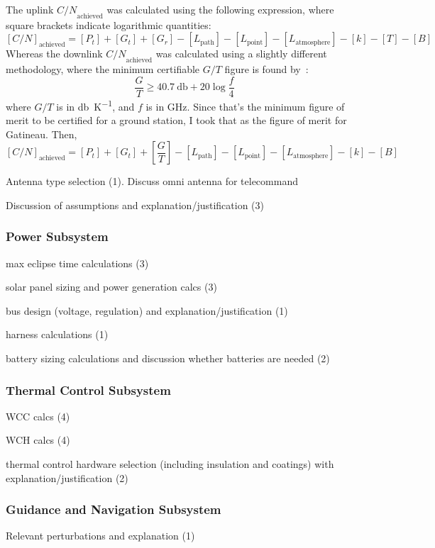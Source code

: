 \documentclass[9pt]{article}
\begin{document}
The uplink ${C/N}_\text{achieved}$ was calculated using the following expression, where square brackets indicate logarithmic quantities:
\begin{equation}\label{eq:uplinkachieved}
  [C/N]_\text{achieved}=[P_t] + [G_t] + [G_r] - [L_\text{path}] - [L_\text{point}] - [L_\text{atmosphere}] - [k] -[T]-[B]
\end{equation}
Whereas the downlink ${C/N}_\text{achieved}$ was calculated using a slightly different methodology, where the minimum certifiable $G/T$ figure is found by~\cite[I, p. 40]{commlinks}:
\begin{equation}\label{eq:minGT}
  \frac GT\ge \qty{40.7}{\decibel}+20\log{\frac f4}
\end{equation}
where $G/T$ is in \si{\decibel\per\kelvin}, and $f$ is in \si{\giga\hertz}.
Since that's the minimum figure of merit to be certified for a ground station, I took that as the figure of merit for Gatineau.
Then,
\begin{equation}\label{eq:downlinkachieved}
  [{C/N}]_\text{achieved}=[P_t]+[G_t]+\left[\frac GT\right]-[L_\text{path}]-[L_\text{point}]-[L_\text{atmosphere}]-[k]-[B]
\end{equation}

Antenna type selection (1). Discuss omni antenna for telecommand

Discussion of assumptions and explanation/justification (3)

\subsubsection{Power Subsystem}
max eclipse time calculations (3)

solar panel sizing and power generation calcs (3)

bus design (voltage, regulation) and explanation/justification (1)

harness calculations (1)

battery sizing calculations and discussion whether batteries are needed (2)

\subsubsection{Thermal Control Subsystem}
WCC calcs (4)

WCH calcs (4)

thermal control hardware selection (including insulation and coatings) with explanation/justification (2)

\subsubsection{Guidance and Navigation Subsystem}
Relevant perturbations and explanation (1)
\end{document}
